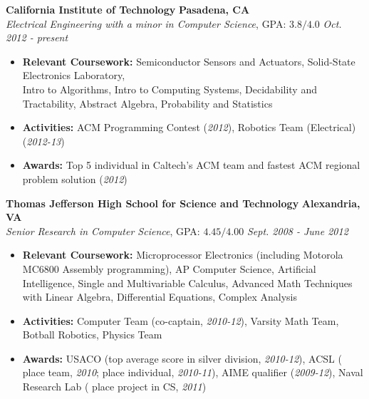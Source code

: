 \documentclass{article}
\newenvironment{changemargin}[2]{%
  \begin{list}{}{%
    \setlength{\topsep}{0pt}%
    \setlength{\leftmargin}{#1}%
    \setlength{\rightmargin}{#2}%
    \setlength{\listparindent}{\parindent}%
    \setlength{\itemindent}{\parindent}%
    \setlength{\parsep}{\parskip}%
  }%
  \item[]}{\end{list}
}
\newenvironment{body} {
	\vspace*{-16pt}
	\begin{changemargin}{-0.25in}{-0.5in}
  }	
	{\end{changemargin}
}
\begin{document}
\begin{body}
	\vspace{14pt}
	\textbf{California Institute of Technology} \hfill \textbf{Pasadena, CA}{} \\
	\emph{Electrical Engineering with a minor in Computer Science}, GPA: $3.8/4.0$ \hfill \emph{Oct. 2012 - present} \\
	\begin{itemize}%
	\item \textbf{Relevant Coursework:} Semiconductor Sensors and Actuators, Solid-State Electronics Laboratory,\\ Intro to Algorithms, Intro to Computing Systems, Decidability and Tractability, Abstract Algebra, Probability and Statistics
	\item \textbf{Activities:} ACM Programming Contest (\textit{2012}), Robotics Team (Electrical) (\textit{2012-13})
	\item \textbf{Awards:} Top 5 individual in Caltech's ACM team and fastest ACM regional problem solution (\textit{2012})
	\end{itemize}

	\medskip

	\textbf{Thomas Jefferson High School for Science and Technology} \hfill \textbf{Alexandria, VA} \\
	\emph{Senior Research in Computer Science}, GPA: $4.45/4.00$ \hfill \emph{Sept. 2008 - June 2012} \\
	\begin{itemize}%
	\item \textbf{Relevant Coursework:} Microprocessor Electronics (including Motorola MC6800 Assembly programming), AP Computer Science, Artificial Intelligence, Single and Multivariable Calculus, Advanced Math Techniques with Linear Algebra, Differential Equations, Complex Analysis
	\item \textbf{Activities:} Computer Team (co-captain, \textit{2010-12}), Varsity Math Team, Botball Robotics, Physics Team
	\item \textbf{Awards:} USACO (top average score in silver division, \textit{2010-12}), ACSL ( place team, \textit{2010};  place individual, \textit{2010-11}), AIME qualifier (\textit{2009-12}), Naval Research Lab ( place project in CS, \textit{2011})
	\end{itemize}
\end{body}

\smallskip
\end{document}

